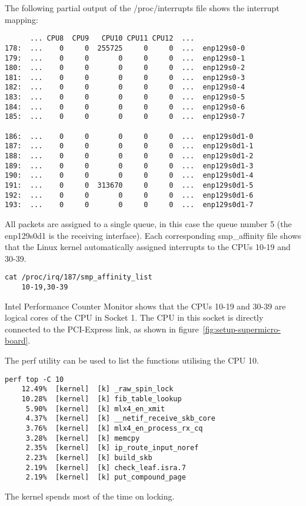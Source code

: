 The following partial output of the /proc/interrupts file shows the interrupt mapping:
\begin{lstlisting}
      ... CPU8  CPU9   CPU10 CPU11 CPU12  ...
178:  ...    0     0  255725     0     0  ...  enp129s0-0
179:  ...    0     0       0     0     0  ...  enp129s0-1
180:  ...    0     0       0     0     0  ...  enp129s0-2
181:  ...    0     0       0     0     0  ...  enp129s0-3
182:  ...    0     0       0     0     0  ...  enp129s0-4
183:  ...    0     0       0     0     0  ...  enp129s0-5
184:  ...    0     0       0     0     0  ...  enp129s0-6
185:  ...    0     0       0     0     0  ...  enp129s0-7

186:  ...    0     0       0     0     0  ...  enp129s0d1-0
187:  ...    0     0       0     0     0  ...  enp129s0d1-1
188:  ...    0     0       0     0     0  ...  enp129s0d1-2
189:  ...    0     0       0     0     0  ...  enp129s0d1-3
190:  ...    0     0       0     0     0  ...  enp129s0d1-4
191:  ...    0     0  313670     0     0  ...  enp129s0d1-5
192:  ...    0     0       0     0     0  ...  enp129s0d1-6
193:  ...    0     0       0     0     0  ...  enp129s0d1-7
\end{lstlisting}
All packets are assigned to a single queue, in this case the queue number 5 (the enp129s0d1 is the receiving interface).
Each corresponding smp\_affinity file shows that the Linux kernel
automatically assigned interrupts to the CPUs 10-19 and 30-39.
\begin{lstlisting}
cat /proc/irq/187/smp_affinity_list
	10-19,30-39
\end{lstlisting}
Intel Performance Counter Monitor shows that the CPUs 10-19 and 30-39 are
logical cores of the CPU in Socket 1.
The CPU in this socket is directly connected to the PCI-Express link, as shown in figure~\ref{fig:setup-supermicro-board}.

The perf utility can be used to list the functions utilising the CPU 10.
\begin{lstlisting}
perf top -C 10
	12.49%  [kernel]  [k] _raw_spin_lock
	10.28%  [kernel]  [k] fib_table_lookup
	 5.90%  [kernel]  [k] mlx4_en_xmit
	 4.37%  [kernel]  [k] __netif_receive_skb_core
	 3.76%  [kernel]  [k] mlx4_en_process_rx_cq
	 3.28%  [kernel]  [k] memcpy
	 2.35%  [kernel]  [k] ip_route_input_noref
	 2.23%  [kernel]  [k] build_skb
	 2.19%  [kernel]  [k] check_leaf.isra.7
	 2.19%  [kernel]  [k] put_compound_page
\end{lstlisting}
The kernel spends most of the time on locking.

